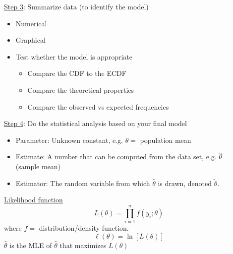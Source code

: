\underline{Step 3}: Summarize data (to identify the model)
\begin{itemize}
    \item Numerical
    \item Graphical
    \item Test whether the model is appropriate
          \begin{itemize}
              \item Compare the CDF to the ECDF
              \item Compare the theoretical properties
              \item Compare the observed vs expected frequencies
          \end{itemize}
\end{itemize}

\underline{Step 4}: Do the statistical analysis based on your final model
\begin{itemize}
    \item Parameter: Unknown constant, e.g. $ \theta= $ population mean
    \item Estimate: A number that can be computed from the data set, e.g.
          $ \hat{\theta}= $ (sample mean)
    \item Estimator: The random variable from which $ \hat{\theta} $ is drawn,
          denoted $ \tilde{\theta} $.
\end{itemize}

\underline{Likelihood function}
\[ L(\theta)=\prod_{i=1}^n f(y_i;\theta) \]
where $ f= $ distribution/density function.
\[ \ell(\theta)=\ln\left[ L(\theta) \right] \]
$ \hat{\theta} $ is the MLE of $ \hat{\theta} $ that maximizes $ L(\theta) $

